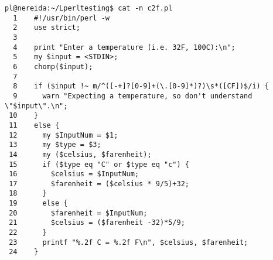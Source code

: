 \begin{latexonly}
\begin{verbatim}
pl@nereida:~/Lperltesting$ cat -n c2f.pl
  1    #!/usr/bin/perl -w
  2    use strict;
  3  
  4    print "Enter a temperature (i.e. 32F, 100C):\n";
  5    my $input = <STDIN>;
  6    chomp($input);
  7  
  8    if ($input !~ m/^([-+]?[0-9]+(\.[0-9]*)?)\s*([CF])$/i) {
  9      warn "Expecting a temperature, so don't understand \"$input\".\n";
 10    }
 11    else {
 12      my $InputNum = $1;
 13      my $type = $3;
 14      my ($celsius, $farenheit);
 15      if ($type eq "C" or $type eq "c") {
 16        $celsius = $InputNum;
 17        $farenheit = ($celsius * 9/5)+32;
 18      }
 19      else {
 20        $farenheit = $InputNum;
 21        $celsius = ($farenheit -32)*5/9;
 22      }
 23      printf "%.2f C = %.2f F\n", $celsius, $farenheit;
 24    }
\end{verbatim}
\end{latexonly}
